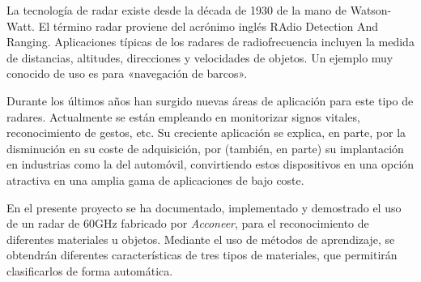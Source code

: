 
La tecnología de radar existe desde la década de 1930 de la mano de Watson-Watt. El término radar proviene del acrónimo inglés RAdio Detection And Ranging. Aplicaciones típicas de los radares de radiofrecuencia incluyen la medida de distancias, altitudes, direcciones y velocidades de objetos. Un ejemplo muy conocido de uso es para «navegación de barcos».

Durante los últimos años han surgido nuevas áreas de aplicación para este tipo de radares. Actualmente se están empleando en monitorizar signos vitales, reconocimiento de gestos, etc. Su creciente aplicación se explica, en parte, por la disminución en su coste de adquisición, por (también, en parte) su implantación en industrias como la del automóvil, convirtiendo estos dispositivos en una opción atractiva en una amplia gama de aplicaciones de bajo coste.

En el presente proyecto se ha documentado, implementado y demostrado el uso de un radar de 60GHz fabricado por \textit{Acconeer}, para el reconocimiento de diferentes materiales u objetos. Mediante el uso de métodos de aprendizaje, se obtendrán diferentes características de tres tipos de materiales, que permitirán clasificarlos de forma automática.

